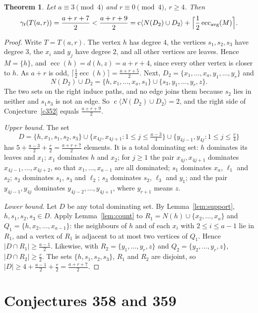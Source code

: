 \documentclass[11pt]{amsart}
\newtheorem{theorem}{Theorem}[section]
\theoremstyle{definition}
\theoremstyle{remark}
\numberwithin{equation}{section}
\newcommand{\gt}{\gamma_t}
\newcommand{\ecc}{\operatorname{ecc}}
\newcommand{\comp}{\operatorname{c}}
\begin{document}
\begin{theorem}\label{thm:352}
Let $a\equiv3\pmod 4$ and $r\equiv0\pmod 4$, $r\ge4$. Then
\[
\gt(T(a,r))=\frac{a+r+7}2<\frac{a+r+9}2=\comp\langle N(D_2)\cup D_2\rangle+\Bigl\lceil\frac12\ecc_{\mathrm{avg}}(M)\Bigr\rceil .
\]
\end{theorem}

\begin{proof}
Write $T=T(a,r)$. The vertex $h$ has degree $4$, the vertices $s_1,s_2,s_3$ have degree $3$, the $x_i$ and $y_j$ have degree $2$, and all other vertices are leaves. Hence $M=\{h\}$, and $\ecc(h)=d(h,z)=a+r+4$, since every other vertex is closer to $h$. As $a+r$ is odd, $\lceil\frac12\ecc(h)\rceil=\frac{a+r+5}2$. Next, $D_2=\{x_1,\dots,x_a,y_1,\dots,y_r\}$ and
\[
N(D_2)\cup D_2=\{h,x_1,\dots,x_a,s_1\}\cup\{s_3,y_1,\dots,y_r,z\}.
\]
The two sets on the right induce paths, and no edge joins them because $s_2$ lies in neither and $s_1s_3$ is not an edge. So $\comp\langle N(D_2)\cup D_2\rangle=2$, and the right side of Conjecture~\ref{c352} equals $\frac{a+r+9}2$.

\emph{Upper bound.} The set
\[
D=\{h,x_1,s_1,s_2,s_3\}\cup\{x_{4j},x_{4j+1}:1\le j\le\tfrac{a-3}4\}\cup\{y_{4j-1},y_{4j}:1\le j\le\tfrac r4\}
\]
has $5+\frac{a-3}2+\frac r2=\frac{a+r+7}2$ elements. It is a total dominating set: $h$ dominates its leaves and $x_1$; $x_1$ dominates $h$ and $x_2$; for $j\ge1$ the pair $x_{4j},x_{4j+1}$ dominates $x_{4j-1},\dots,x_{4j+2}$, so that $x_1,\dots,x_{a-1}$ are all dominated; $s_1$ dominates $x_a$, $\ell_1$ and $s_2$; $s_2$ dominates $s_1$, $s_3$ and $\ell_2$; $s_3$ dominates $s_2$, $\ell_3$ and $y_1$; and the pair $y_{4j-1},y_{4j}$ dominates $y_{4j-2},\dots,y_{4j+1}$, where $y_{r+1}$ means $z$.

\emph{Lower bound.} Let $D$ be any total dominating set. By Lemma~\ref{lem:support}, $h,s_1,s_2,s_3\in D$. Apply Lemma~\ref{lem:count} to $R_1=N(h)\cup\{x_2,\dots,x_a\}$ and $Q_1=\{h,x_2,\dots,x_{a-1}\}$: the neighbours of $h$ and of each $x_i$ with $2\le i\le a-1$ lie in $R_1$, and a vertex of $R_1$ is adjacent to at most two vertices of $Q_1$. Hence $|D\cap R_1|\ge\frac{a-1}2$. Likewise, with $R_2=\{y_1,\dots,y_r,z\}$ and $Q_2=\{y_2,\dots,y_r,z\}$, $|D\cap R_2|\ge\frac r2$. The sets $\{h,s_1,s_2,s_3\}$, $R_1$ and $R_2$ are disjoint, so $|D|\ge4+\frac{a-1}2+\frac r2=\frac{a+r+7}2$.
\end{proof}

\section{Conjectures 358 and 359}\label{sec:358}
\end{document}
